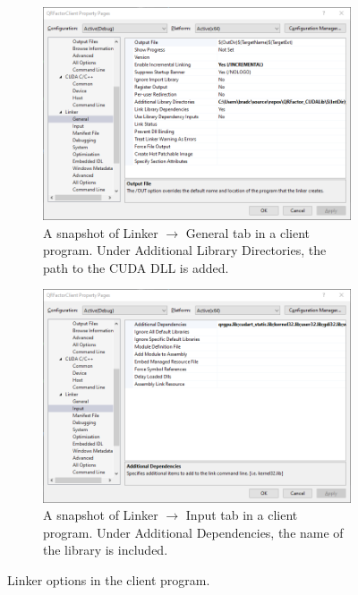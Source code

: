 \documentclass[11pt,letterpaper]{article}
\begin{document}
\begin{figure}
    \centering
    \begin{subfigure}[t]{0.48\textwidth}
        \includegraphics[width=\textwidth]{DLL_ClientLinkerGeneral.png}
        \caption{A snapshot of Linker $\to$ General tab in a client program. Under Additional Library Directories, the path to the CUDA DLL is added.}
        \label{fig: linker}
    \end{subfigure}
    \hfill
    \begin{subfigure}[t]{0.48\textwidth}
        \includegraphics[width=\textwidth]{DLL_CLientLinkerInput.png}
        \caption{A snapshot of Linker $\to$ Input tab in a client program. Under Additional Dependencies, the name of the library is included.}
        \label{fig: dependencies}
    \end{subfigure}
    \caption{Linker options in the client program.}
\end{figure}
\end{document}

